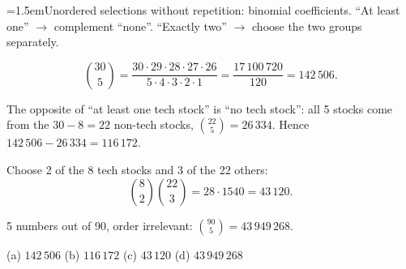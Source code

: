\begin{solution}
	{\emergencystretch=1.5em\idea Unordered selections without repetition: binomial coefficients. ``At
	least one'' $\to$ complement ``none''. ``Exactly two'' $\to$ choose the two
	groups separately.\par}

	\[ \binom{30}{5}=\frac{30\cdot29\cdot28\cdot27\cdot26}{5\cdot4\cdot3\cdot2\cdot1}
		=\frac{17\,100\,720}{120}=142\,506. \]

	 The opposite of ``at least one tech stock'' is ``no tech stock'':
	all 5 stocks come from the $30-8=22$ non-tech stocks, $\binom{22}{5}=26\,334$.
	Hence $142\,506-26\,334=116\,172$.

	 Choose 2 of the 8 tech stocks and 3 of the 22 others:
	\[ \binom82\binom{22}{3}=28\cdot1540=43\,120. \]

	 5 numbers out of 90, order irrelevant:
	$\binom{90}{5}=43\,949\,268$.

	\begin{answer}
		(a) $142\,506$ \quad (b) $116\,172$ \quad (c) $43\,120$ \quad
		(d) $43\,949\,268$
	\end{answer}
\end{solution}
